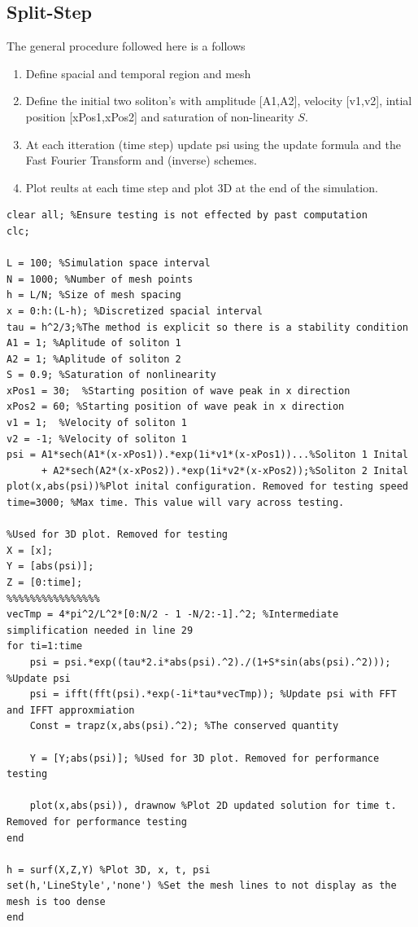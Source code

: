 \documentclass{article}
\begin{document}
\subsection{Split-Step}
The general procedure followed here is a follows
\begin{enumerate}
\item Define spacial and temporal region and mesh
\item Define the initial two soliton's with amplitude [A1,A2], velocity [v1,v2], intial position [xPos1,xPos2] and saturation of non-linearity $S$.
\item At each itteration (time step) update psi using the update formula and the Fast Fourier Transform and (inverse) schemes. 
\item Plot reults at each time step and plot 3D at the end of the simulation. 
\end{enumerate}
\begin{lstlisting}
clear all; %Ensure testing is not effected by past computation
clc;

L = 100; %Simulation space interval
N = 1000; %Number of mesh points
h = L/N; %Size of mesh spacing
x = 0:h:(L-h); %Discretized spacial interval
tau = h^2/3;%The method is explicit so there is a stability condition
A1 = 1; %Aplitude of soliton 1
A2 = 1; %Aplitude of soliton 2
S = 0.9; %Saturation of nonlinearity
xPos1 = 30;  %Starting position of wave peak in x direction
xPos2 = 60; %Starting position of wave peak in x direction
v1 = 1;  %Velocity of soliton 1
v2 = -1; %Velocity of soliton 1
psi = A1*sech(A1*(x-xPos1)).*exp(1i*v1*(x-xPos1))...%Soliton 1 Inital
      + A2*sech(A2*(x-xPos2)).*exp(1i*v2*(x-xPos2));%Soliton 2 Inital
plot(x,abs(psi))%Plot inital configuration. Removed for testing speed
time=3000; %Max time. This value will vary across testing.

%Used for 3D plot. Removed for testing
X = [x];
Y = [abs(psi)];
Z = [0:time];
%%%%%%%%%%%%%%%%
vecTmp = 4*pi^2/L^2*[0:N/2 - 1 -N/2:-1].^2; %Intermediate simplification needed in line 29
for ti=1:time
    psi = psi.*exp((tau*2.i*abs(psi).^2)./(1+S*sin(abs(psi).^2))); %Update psi
    psi = ifft(fft(psi).*exp(-1i*tau*vecTmp)); %Update psi with FFT and IFFT approxmiation
    Const = trapz(x,abs(psi).^2); %The conserved quantity

    Y = [Y;abs(psi)]; %Used for 3D plot. Removed for performance testing
    
    plot(x,abs(psi)), drawnow %Plot 2D updated solution for time t. Removed for performance testing
end

h = surf(X,Z,Y) %Plot 3D, x, t, psi 
set(h,'LineStyle','none') %Set the mesh lines to not display as the mesh is too dense
end
\end{lstlisting}
\pagebreak
\end{document}
